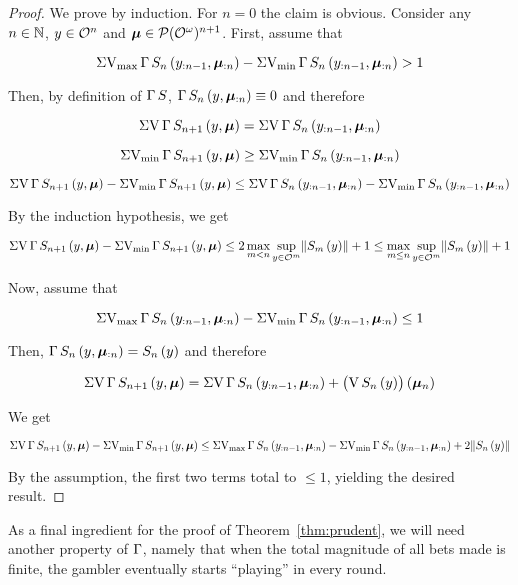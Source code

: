 \begin{proof}

We prove by induction. For $n=0$ the claim is obvious. Consider any ${n \in \Nats}$, $y \in \Ob^{n}$ and $\BM \in \PMO^{n+1}$. First, assume that

$$\SVX \PG{S}_n\left(y_{:n-1},\BM_{:n}\right) - \SVM \PG{S}_n\left(y_{:n-1},\BM_{:n}\right) > 1$$

Then, by definition of ${\PG{S}}$, ${\PG{S}_n}\left(y,\BM_{:n}\right) \equiv 0$ and therefore

$$\SV \PG{S}_{n+1}\left(y,\BM\right)=\SV \PG{S}_n\left(y_{:n-1},\BM_{:n}\right)$$

$$\SVM \PG{S}_{n+1}\left(y,\BM\right) \geq \SVM \PG{S}_n\left(y_{:n-1},\BM_{:n}\right)$$

$$\SV \PG{S}_{n+1}\left(y,\BM\right) - \SVM \PG{S}_{n+1}\left(y,\BM\right) \leq \SV \PG{S}_n\left(y_{:n-1},\BM_{:n}\right) - \SVM \PG{S}_n\left(y_{:n-1},\BM_{:n}\right) $$

By the induction hypothesis, we get

$$\SV \PG{S}_{n+1}\left(y,\BM\right) - \SVM \PG{S}_{n+1}\left(y,\BM\right) \leq  2 \max_{m < n} \sup_{y \in \Ob^m} \N{S_m\left(y\right)}  + 1 \leq \max_{m \leq n} \sup_{y \in \Ob^m} \N{S_m\left(y\right)}  + 1$$

Now, assume that 

$$\SVX \PG{S}_n\left(y_{:n-1},\BM_{:n}\right) - \SVM \PG{S}_n\left(y_{:n-1},\BM_{:n}\right) \leq 1$$

Then, ${\PG{S}_n}\left(y,\BM_{:n}\right) = {S_n}\left(y\right)$ and therefore

$$\SV \PG{S}_{n+1}\left(y,\BM\right)=\SV \PG{S}_n\left(y_{:n-1},\BM_{:n}\right) + \left(\V{S}_n\left(y\right)\right)\left(\BM_n\right)$$

We get

$$\SV \PG{S}_{n+1}\left(y,\BM\right) - \SVM \PG{S}_{n+1}\left(y,\BM\right) \leq \SVX \PG{S}_n\left(y_{:n-1},\BM_{:n}\right) - \SVM \PG{S}_n\left(y_{:n-1},\BM_{:n}\right) + 2 \N{S_n\left(y\right)}$$

By the assumption, the first two terms total to ${\leq 1}$, yielding the desired result.
\end{proof}

As a final ingredient for the proof of Theorem~\ref{thm:prudent}, we will need another property of $\PG$, namely that when the total magnitude of all bets made is finite, the gambler eventually starts \enquote{playing} in every round.


